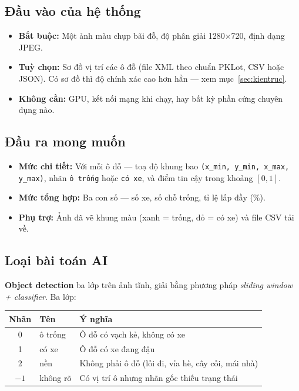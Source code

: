 \documentclass[12pt]{ai_conquer2026}
\begin{document}
\subsection{Đầu vào của hệ thống}

\begin{itemize}
\item \textbf{Bắt buộc:} Một ảnh màu chụp bãi đỗ, độ phân giải 1280$\times$720, định dạng JPEG.
\item \textbf{Tuỳ chọn:} Sơ đồ vị trí các ô đỗ (file XML theo chuẩn PKLot, CSV hoặc JSON). Có sơ đồ thì độ chính xác cao hơn hẳn --- xem mục~\ref{sec:kientruc}.
\item \textbf{Không cần:} GPU, kết nối mạng khi chạy, hay bất kỳ phần cứng chuyên dụng nào.
\end{itemize}

\subsection{Đầu ra mong muốn}

\begin{itemize}
\item \textbf{Mức chi tiết:} Với mỗi ô đỗ --- toạ độ khung bao \texttt{(x\_min, y\_min, x\_max, y\_max)}, nhãn \texttt{ô trống} hoặc \texttt{có xe}, và điểm tin cậy trong khoảng $[0,1]$.
\item \textbf{Mức tổng hợp:} Ba con số --- số xe, số chỗ trống, tỉ lệ lấp đầy (\%).
\item \textbf{Phụ trợ:} Ảnh đã vẽ khung màu (xanh = trống, đỏ = có xe) và file CSV tải về.
\end{itemize}

\subsection{Loại bài toán AI}

\textbf{Object detection} ba lớp trên ảnh tĩnh, giải bằng phương pháp \textit{sliding window + classifier}. Ba lớp:

\begin{center}
\begin{tabular}{|c|l|l|}
\hline
\textbf{Nhãn} & \textbf{Tên} & \textbf{Ý nghĩa} \\
\hline
0 & ô trống & Ô đỗ có vạch kẻ, không có xe \\
1 & có xe & Ô đỗ có xe đang đậu \\
2 & nền & Không phải ô đỗ (lối đi, vỉa hè, cây cối, mái nhà) \\
$-1$ & không rõ & Có vị trí ô nhưng nhãn gốc thiếu trạng thái \\
\hline
\end{tabular}
\end{center}
\end{document}
